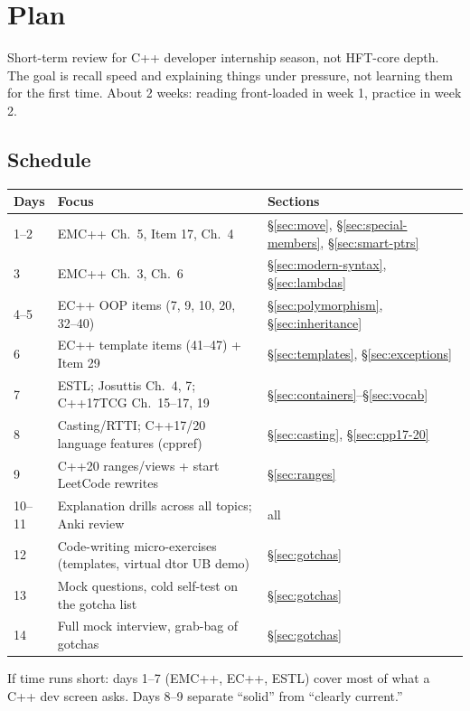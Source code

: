 \section{Plan}\label{sec:plan}

Short-term review for C++ developer internship season, not HFT-core depth. The goal is recall speed
and explaining things under pressure, not learning them for the first time. About 2 weeks: reading
front-loaded in week 1, practice in week 2.

\subsection*{Schedule}
\begin{tabularx}{\textwidth}{|l|X|l|}
\hline
\textbf{Days} & \textbf{Focus} & \textbf{Sections} \\ \hline
1--2  & EMC++ Ch.~5, Item 17, Ch.~4 & \S\ref{sec:move}, \S\ref{sec:special-members}, \S\ref{sec:smart-ptrs} \\ \hline
3     & EMC++ Ch.~3, Ch.~6 & \S\ref{sec:modern-syntax}, \S\ref{sec:lambdas} \\ \hline
4--5  & EC++ OOP items (7, 9, 10, 20, 32--40) & \S\ref{sec:polymorphism}, \S\ref{sec:inheritance} \\ \hline
6     & EC++ template items (41--47) + Item 29 & \S\ref{sec:templates}, \S\ref{sec:exceptions} \\ \hline
7     & ESTL; Josuttis Ch.~4, 7; C++17TCG Ch.~15--17, 19 & \S\ref{sec:containers}--\S\ref{sec:vocab} \\ \hline
8     & Casting/RTTI; C++17/20 language features (cppref) & \S\ref{sec:casting}, \S\ref{sec:cpp17-20} \\ \hline
9     & C++20 ranges/views + start LeetCode rewrites & \S\ref{sec:ranges} \\ \hline
10--11 & Explanation drills across all topics; Anki review & all \\ \hline
12    & Code-writing micro-exercises (templates, virtual dtor UB demo) & \S\ref{sec:gotchas} \\ \hline
13    & Mock questions, cold self-test on the gotcha list & \S\ref{sec:gotchas} \\ \hline
14    & Full mock interview, grab-bag of gotchas & \S\ref{sec:gotchas} \\ \hline
\end{tabularx}

If time runs short: days 1--7 (EMC++, EC++, ESTL) cover most of what a C++ dev screen asks. Days 8--9
separate ``solid'' from ``clearly current.''

